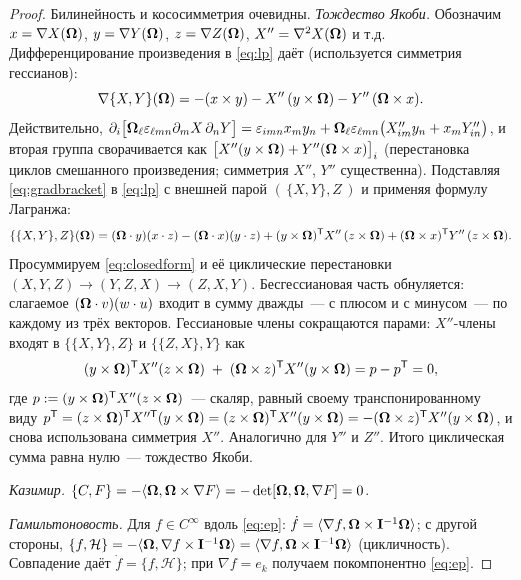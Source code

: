 \begin{proof}
Билинейность и кососимметрия очевидны. \emph{Тождество Якоби.}
Обозначим $x = \nabla X(\boldsymbol{\Omega})$, $y = \nabla Y(\boldsymbol{\Omega})$, $z = \nabla Z(\boldsymbol{\Omega})$,
$X'' = \nabla^2X(\boldsymbol{\Omega})$ и т.д. Дифференцирование произведения в
\eqref{eq:lp} даёт (используется симметрия гессианов):
\begin{equation}\label{eq:gradbracket}
  \nabla\{X,Y\}(\boldsymbol{\Omega}) = -(x\times y) - X''\,(y\times\boldsymbol{\Omega}) - Y''\,(\boldsymbol{\Omega}\times x).
\end{equation}
Действительно, $\partial_i\bigl[\boldsymbol{\Omega}_\ell\varepsilon_{\ell mn}\partial_mX\,\partial_nY\bigr]
= \varepsilon_{imn}x_my_n + \boldsymbol{\Omega}_\ell\varepsilon_{\ell mn}
\bigl(X''_{im}y_n + x_mY''_{in}\bigr)$, и вторая группа сворачивается как
$\bigl[X''(y\times\boldsymbol{\Omega}) + Y''(\boldsymbol{\Omega}\times x)\bigr]_i$
(перестановка циклов смешанного произведения; симметрия $X''$, $Y''$
существенна). Подставляя \eqref{eq:gradbracket} в \eqref{eq:lp} с
внешней парой $(\,\{X,Y\}, Z\,)$ и применяя формулу Лагранжа:
\begin{equation}\label{eq:closedform}
  \{\{X,Y\},Z\}(\boldsymbol{\Omega})
  = (\boldsymbol{\Omega}\cdot y)(x\cdot z) - (\boldsymbol{\Omega}\cdot x)(y\cdot z)
  + (y\times\boldsymbol{\Omega})^{\mathsf T} X''\,(z\times\boldsymbol{\Omega})
  + (\boldsymbol{\Omega}\times x)^{\mathsf T} Y''\,(z\times\boldsymbol{\Omega}).
\end{equation}
Просуммируем \eqref{eq:closedform} и её циклические перестановки
$(X,Y,Z) \to (Y,Z,X) \to (Z,X,Y)$. Бесгессиановая часть обнуляется:
слагаемое $(\boldsymbol{\Omega}\cdot v)(w\cdot u)$ входит в сумму дважды~---
с плюсом и с минусом~--- по каждому из трёх векторов. Гессиановые
члены сокращаются парами: $X''$-члены входят в
$\{\{X,Y\},Z\}$ и $\{\{Z,X\},Y\}$ как
\[
  (y\times\boldsymbol{\Omega})^{\mathsf T}X''(z\times\boldsymbol{\Omega})
  \;+\;(\boldsymbol{\Omega}\times z)^{\mathsf T}X''(y\times\boldsymbol{\Omega})
  = p - p^{\mathsf T} = 0,
\]
где $p := (y\times\boldsymbol{\Omega})^{\mathsf T}X''(z\times\boldsymbol{\Omega})$~--- скаляр, равный
своему транспонированному виду
$p^{\mathsf T} = (z\times\boldsymbol{\Omega})^{\mathsf T}X{}''^{\mathsf T}(y\times\boldsymbol{\Omega})
= (z\times\boldsymbol{\Omega})^{\mathsf T}X''(y\times\boldsymbol{\Omega}) = -(\boldsymbol{\Omega}\times z)^{\mathsf T}X''(y\times\boldsymbol{\Omega})$,
и снова использована симметрия $X''$. Аналогично для $Y''$ и $Z''$.
Итого циклическая сумма равна нулю~--- тождество Якоби.

\emph{Казимир.} $\{C,F\} = -\langle \boldsymbol{\Omega}, \boldsymbol{\Omega}\times\nabla F\rangle
= -\det[\boldsymbol{\Omega},\boldsymbol{\Omega},\nabla F] = 0$.

\emph{Гамильтоновость.} Для $f \in C^\infty$ вдоль \eqref{eq:ep}:
$\dot f = \langle\nabla f, \boldsymbol{\Omega}\times\mathbf{I}^{-1}\boldsymbol{\Omega}\rangle$; с другой
стороны, $\{f,\mathcal H\} = -\langle\boldsymbol{\Omega}, \nabla f\times\mathbf{I}^{-1}\boldsymbol{\Omega}\rangle
= \langle \nabla f, \boldsymbol{\Omega}\times\mathbf{I}^{-1}\boldsymbol{\Omega}\rangle$ (цикличность).
Совпадение даёт $\dot f = \{f,\mathcal H\}$; при $\nabla f = e_k$
получаем покомпонентно \eqref{eq:ep}.
\end{proof}

